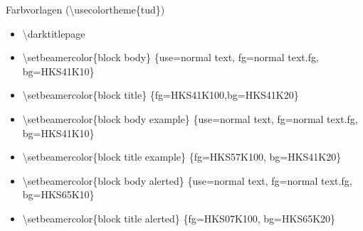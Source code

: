 \documentclass[presentation,t]{beamer}
\begin{document}
\begin{frame}[allowframebreaks,label=sec-2-4-2]{Farbvorlagen (\textbackslash usecolortheme\{tud\})}
\begin{itemize}
\begin{itemize}
text/titlepage, fg=normal text/titlepage.fg\}\%
\item \textbackslash setbeamercolor\{subtitle\} \{use=normal
text/titlepagexo, fg=normal text/titlepage.fg\}\%
\item \textbackslash setbeamercolor\{author/titlepage\} \{use=normal
text/titlepage, fg=normal text/titlepage.fg\}\%
\item \textbackslash setbeamercolor\{headline/titlepage\} \{use=normal
text/titlepage, fg=normal text/titlepage.fg\}\%
\item \textbackslash setbeamercolor\{logo/titlepage\} \{use=normal
text/titlepage, fg=normal text/titlepage.fg\}\%
\item \textbackslash setbeamercolor\{einrichtung/titlepage\} \{fg=HKS92K100\}\%
\item \textbackslash setbeamercolor\{fachrichtung/titlepage\}
\{use=einrichtung/titlepage, fg=einrichtung/titlepage.fg\}\%
\item \textbackslash setbeamercolor\{institut/titlepage\}
\{use=einrichtung/titlepage, fg=einrichtung/titlepage.fg\}\%
\item \textbackslash setbeamercolor\{professur/titlepage\}
\{use=einrichtung/titlepage, fg=einrichtung/titlepage.fg\}\%
\item \textbackslash setbeamercolor\{upper separation line
head/titlepage\} \{fg=HKS92K100\}\%
\item \textbackslash setbeamercolor\{lower separation line head/titlepage\}\%
\{use=upper separation line head/titlepage,fg=upper separation line
  head/titlepage.fg\}\%
\item \textbackslash setbeamercolor\{date in head/foot/titlepage\} \{fg=HKS92K100\}\%
\item \textbackslash let\textbackslash logo$\backslash$@ DDC\textbackslash logo$\backslash$@ DDC$\backslash$@ bunt\%
\item \textbackslash let\textbackslash logo$\backslash$@ DDCf\textbackslash logo$\backslash$@ DDC$\backslash$@ colorf
\}
\end{itemize}
\item \textbackslash darktitlepage

\item \textbackslash setbeamercolor\{block body\} \{use=normal text,
fg=normal text.fg, bg=HKS41K10\}
\item \textbackslash setbeamercolor\{block title\} \{fg=HKS41K100,bg=HKS41K20\}
\item \textbackslash setbeamercolor\{block body example\} \{use=normal
text, fg=normal text.fg, bg=HKS41K10\}
\item \textbackslash setbeamercolor\{block title example\}
\{fg=HKS57K100, bg=HKS41K20\}
\item \textbackslash setbeamercolor\{block body alerted\} \{use=normal
text, fg=normal text.fg, bg=HKS65K10\}
\item \textbackslash setbeamercolor\{block title alerted\}
\{fg=HKS07K100, bg=HKS65K20\}
\end{itemize}
\end{frame}
\end{document}
